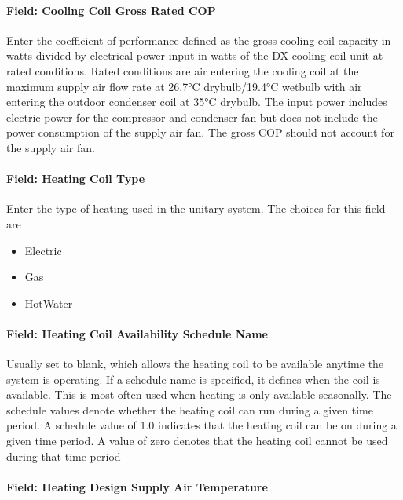 \paragraph{Field: Cooling Coil Gross Rated COP}\label{field-cooling-coil-gross-rated-cop-2}

Enter the coefficient of performance defined as the gross cooling coil capacity in watts divided by electrical power input in watts of the DX cooling coil unit at rated conditions. Rated conditions are air entering the cooling coil at the maximum supply air flow rate at 26.7°C drybulb/19.4°C wetbulb with air entering the outdoor condenser coil at 35°C drybulb. The input power includes electric power for the compressor and condenser fan but does not include the power consumption of the supply air fan. The gross COP should not account for the supply air fan.

\paragraph{Field: Heating Coil Type}\label{field-heating-coil-type-2}

Enter the type of heating used in the unitary system. The choices for this field are

\begin{itemize}
\item
  Electric
\item
  Gas
\item
  HotWater
\end{itemize}

\paragraph{Field: Heating Coil Availability Schedule Name}\label{field-heating-coil-availability-schedule-name-2}

Usually set to blank, which allows the heating coil to be available anytime the system is operating. If a schedule name is specified, it defines when the coil is available. This is most often used when heating is only available seasonally. The schedule values denote whether the heating coil can run during a given time period. A schedule value of 1.0 indicates that the heating coil can be on during a given time period. A value of zero denotes that the heating coil cannot be used during that time period

\paragraph{Field: Heating Design Supply Air Temperature}\label{field-heating-design-supply-air-temperature}

